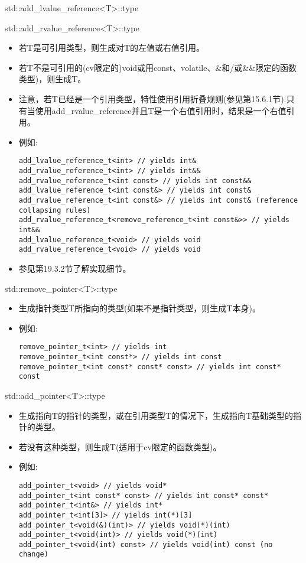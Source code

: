 std::add\_lvalue\_reference<T>::type

std::add\_rvalue\_reference<T>::type

\begin{itemize}
\item
若T是可引用类型，则生成对T的左值或右值引用。

\item
若T不是可引用的(cv限定的)void或用const、volatile、\&和/或\&\&限定的函数类型)，则生成T。

\item
注意，若T已经是一个引用类型，特性使用引用折叠规则(参见第15.6.1节):只有当使用add\_rvalue\_reference并且T是一个右值引用时，结果是一个右值引用。

\item
例如:
\begin{lstlisting}[style=styleCXX]
add_lvalue_reference_t<int> // yields int&
add_rvalue_reference_t<int> // yields int&&
add_rvalue_reference_t<int const> // yields int const&&
add_lvalue_reference_t<int const&> // yields int const&
add_rvalue_reference_t<int const&> // yields int const& (reference collapsing rules)
add_rvalue_reference_t<remove_reference_t<int const&>> // yields int&&
add_lvalue_reference_t<void> // yields void
add_rvalue_reference_t<void> // yields void
\end{lstlisting}

\item
参见第19.3.2节了解实现细节。
\end{itemize}

std::remove\_pointer<T>::type

\begin{itemize}
\item
生成指针类型T所指向的类型(如果不是指针类型，则生成T本身)。

\item
例如:
\begin{lstlisting}[style=styleCXX]
remove_pointer_t<int> // yields int
remove_pointer_t<int const*> // yields int const
remove_pointer_t<int const* const* const> // yields int const* const
\end{lstlisting}
\end{itemize}

std::add\_pointer<T>::type

\begin{itemize}
\item
生成指向T的指针的类型，或在引用类型T的情况下，生成指向T基础类型的指针的类型。

\item
若没有这种类型，则生成T(适用于cv限定的函数类型)。

\item
例如:
\begin{lstlisting}[style=styleCXX]
add_pointer_t<void> // yields void*
add_pointer_t<int const* const> // yields int const* const*
add_pointer_t<int&> // yields int*
add_pointer_t<int[3]> // yields int(*)[3]
add_pointer_t<void(&)(int)> // yields void(*)(int)
add_pointer_t<void(int)> // yields void(*)(int)
add_pointer_t<void(int) const> // yields void(int) const (no change)
\end{lstlisting}
\end{itemize}

